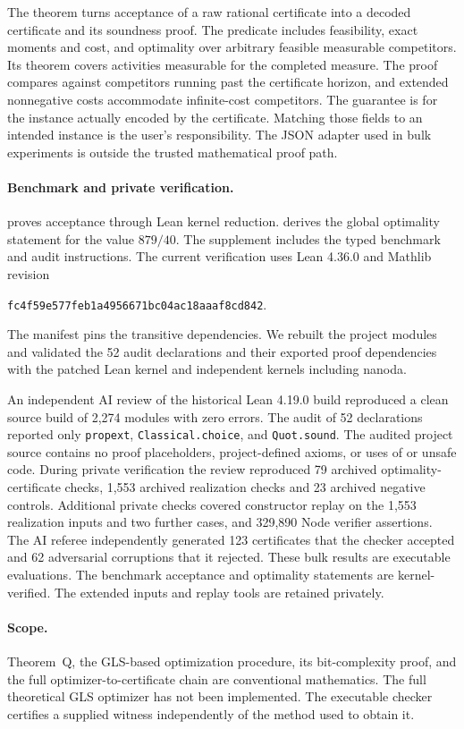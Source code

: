 The theorem  turns acceptance of a raw rational certificate into a decoded certificate and its soundness proof. The predicate  includes feasibility, exact moments and cost, and optimality over arbitrary feasible measurable competitors. Its theorem  covers activities measurable for the completed measure. The proof compares against competitors running past the certificate horizon, and extended nonnegative costs accommodate infinite-cost competitors. The guarantee is for the instance actually encoded by the certificate. Matching those fields to an intended instance is the user's responsibility. The JSON adapter used in bulk experiments is outside the trusted mathematical proof path.

\paragraph{Benchmark and private verification.}
 proves acceptance through Lean kernel reduction.  derives the global optimality statement for the value $879/40$. The supplement includes the typed benchmark and audit instructions. The current verification uses Lean 4.36.0 and Mathlib revision
\begin{center}
 \texttt{\small fc4f59e577feb1a4956671bc04ac18aaaf8cd842}.
\end{center}
The manifest pins the transitive dependencies. We rebuilt the project modules and validated the 52 audit declarations and their exported proof dependencies with the patched Lean kernel and independent kernels including nanoda.

An independent AI review of the historical Lean 4.19.0 build reproduced a clean source build of 2{,}274 modules with zero errors. The audit of 52 declarations reported only \texttt{propext}, \texttt{Classical.choice}, and \texttt{Quot.sound}. The audited project source contains no proof placeholders, project-defined axioms, or uses of  or unsafe code. During private verification the review reproduced 79 archived optimality-certificate checks, 1{,}553 archived realization checks and 23 archived negative controls. Additional private checks covered constructor replay on the 1{,}553 realization inputs and two further cases, and 329{,}890 Node verifier assertions. The AI referee independently generated 123 certificates that the checker accepted and 62 adversarial corruptions that it rejected. These bulk results are executable evaluations. The benchmark acceptance and optimality statements are kernel-verified. The extended inputs and replay tools are retained privately.

\paragraph{Scope.}
Theorem~Q, the GLS-based optimization procedure, its bit-complexity proof, and the full optimizer-to-certificate chain are conventional mathematics. The full theoretical GLS optimizer has not been implemented. The executable checker certifies a supplied witness independently of the method used to obtain it.
